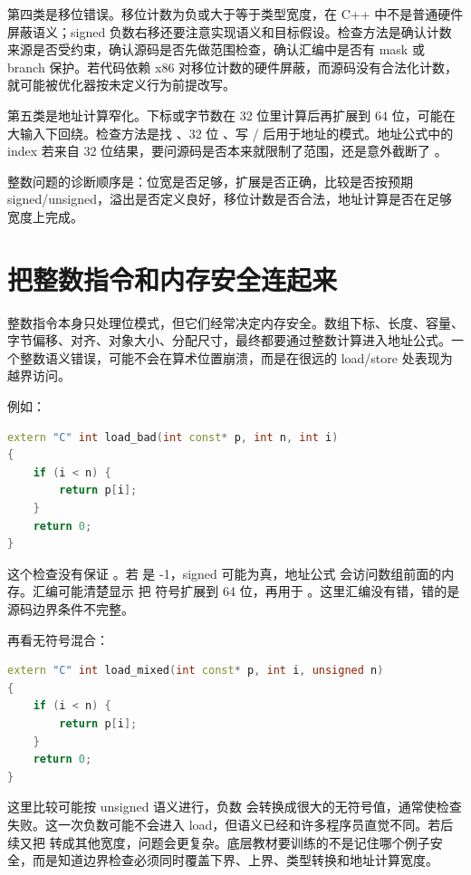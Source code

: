 第四类是移位错误。移位计数为负或大于等于类型宽度，在 C++ 中不是普通硬件屏蔽语义；signed 负数右移还要注意实现语义和目标假设。检查方法是确认计数来源是否受约束，确认源码是否先做范围检查，确认汇编中是否有 mask 或 branch 保护。若代码依赖 x86 对移位计数的硬件屏蔽，而源码没有合法化计数，就可能被优化器按未定义行为前提改写。

第五类是地址计算窄化。下标或字节数在 32 位里计算后再扩展到 64 位，可能在大输入下回绕。检查方法是找 、32 位 、写 / 后用于地址的模式。地址公式中的 index 若来自 32 位结果，要问源码是否本来就限制了范围，还是意外截断了 。

\begin{mentalmodel}
整数问题的诊断顺序是：位宽是否足够，扩展是否正确，比较是否按预期 signed/unsigned，溢出是否定义良好，移位计数是否合法，地址计算是否在足够宽度上完成。
\end{mentalmodel}

\section{把整数指令和内存安全连起来}

整数指令本身只处理位模式，但它们经常决定内存安全。数组下标、长度、容量、字节偏移、对齐、对象大小、分配尺寸，最终都要通过整数计算进入地址公式。一个整数语义错误，可能不会在算术位置崩溃，而是在很远的 load/store 处表现为越界访问。

例如：

\begin{lstlisting}[language=C++]
extern "C" int load_bad(int const* p, int n, int i)
{
    if (i < n) {
        return p[i];
    }
    return 0;
}
\end{lstlisting}

这个检查没有保证 。若  是 -1，signed  可能为真，地址公式  会访问数组前面的内存。汇编可能清楚显示  把  符号扩展到 64 位，再用于 。这里汇编没有错，错的是源码边界条件不完整。

再看无符号混合：

\begin{lstlisting}[language=C++]
extern "C" int load_mixed(int const* p, int i, unsigned n)
{
    if (i < n) {
        return p[i];
    }
    return 0;
}
\end{lstlisting}

这里比较可能按 unsigned 语义进行，负数  会转换成很大的无符号值，通常使检查失败。这一次负数可能不会进入 load，但语义已经和许多程序员直觉不同。若后续又把  转成其他宽度，问题会更复杂。底层教材要训练的不是记住哪个例子安全，而是知道边界检查必须同时覆盖下界、上界、类型转换和地址计算宽度。

